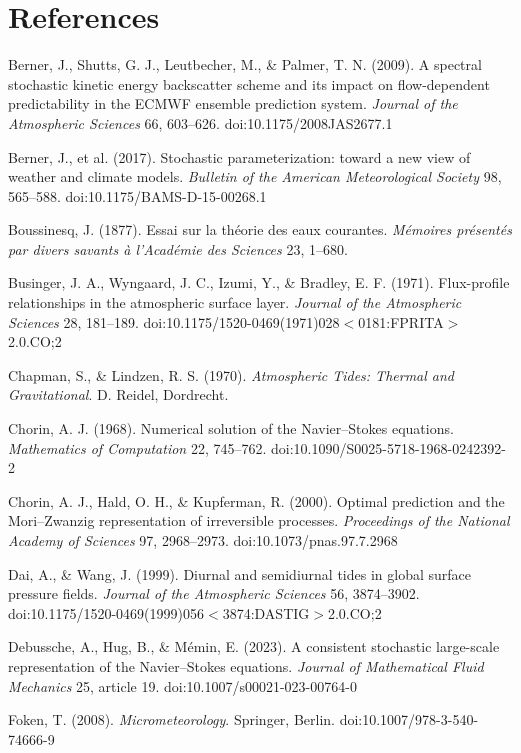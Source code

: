 \documentclass[11pt]{article}
\begin{document}
\begingroup\sloppy
\section*{References}

Berner, J., Shutts, G. J., Leutbecher, M., \& Palmer, T. N. (2009). A spectral stochastic kinetic energy backscatter scheme and its impact on flow-dependent predictability in the ECMWF ensemble prediction system. \emph{Journal of the Atmospheric Sciences} 66, 603--626. doi:10.1175/2008JAS2677.1

Berner, J., et al. (2017). Stochastic parameterization: toward a new view of weather and climate models. \emph{Bulletin of the American Meteorological Society} 98, 565--588. doi:10.1175/BAMS-D-15-00268.1

Boussinesq, J. (1877). Essai sur la th\'eorie des eaux courantes. \emph{M\'emoires pr\'esent\'es par divers savants \`a l'Acad\'emie des Sciences} 23, 1--680.

Businger, J. A., Wyngaard, J. C., Izumi, Y., \& Bradley, E. F. (1971). Flux-profile relationships in the atmospheric surface layer. \emph{Journal of the Atmospheric Sciences} 28, 181--189. doi:10.1175/\hspace{0pt}1520-0469(1971)028$<$0181:FPRITA$>$2.0.CO;2

Chapman, S., \& Lindzen, R. S. (1970). \emph{Atmospheric Tides: Thermal and Gravitational}. D. Reidel, Dordrecht.

Chorin, A. J. (1968). Numerical solution of the Navier--Stokes equations. \emph{Mathematics of Computation} 22, 745--762. doi:10.1090/S0025-5718-1968-0242392-2

Chorin, A. J., Hald, O. H., \& Kupferman, R. (2000). Optimal prediction and the Mori--Zwanzig representation of irreversible processes. \emph{Proceedings of the National Academy of Sciences} 97, 2968--2973. doi:10.1073/pnas.97.7.2968

Dai, A., \& Wang, J. (1999). Diurnal and semidiurnal tides in global surface pressure fields. \emph{Journal of the Atmospheric Sciences} 56, 3874--3902. doi:10.1175/\hspace{0pt}1520-0469(1999)056$<$3874:DASTIG$>$2.0.CO;2

Debussche, A., Hug, B., \& M\'emin, E. (2023). A consistent stochastic large-scale representation of the Navier--Stokes equations. \emph{Journal of Mathematical Fluid Mechanics} 25, article 19. doi:10.1007/s00021-023-00764-0

Foken, T. (2008). \emph{Micrometeorology}. Springer, Berlin. doi:10.1007/\hspace{0pt}978-3-540-74666-9
\end{document}
